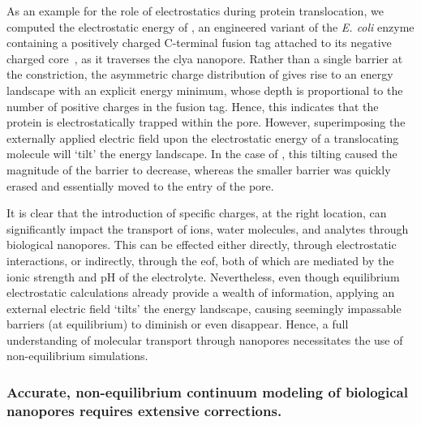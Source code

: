 As an example for the role of electrostatics during protein translocation, we computed the electrostatic
energy of \DHFRt{}, an engineered variant of the \textit{E. coli}  enzyme containing a
positively charged C-terminal fusion tag attached to its negative charged core~\cite{Soskine-Biesemans-2015},
as it traverses the \gls{clya} nanopore. Rather than a single barrier at the constriction, the asymmetric
charge distribution of \DHFRt{} gives rise to an energy landscape with an explicit energy minimum, whose depth
is proportional to the number of positive charges in the fusion tag. Hence, this indicates that the protein is
electrostatically trapped within the pore. However, superimposing the externally applied electric field upon
the electrostatic energy of a translocating molecule will `tilt' the energy landscape. In the case of
\DHFRt{}, this tilting caused the magnitude of the \transi{} barrier to decrease, whereas the smaller \cisi{}
barrier was quickly erased and essentially moved to the \cisi{} entry of the pore.

It is clear that the introduction of specific charges, at the right location, can significantly impact the
transport of ions, water molecules, and analytes through biological nanopores. This can be effected either
directly, through electrostatic interactions, or indirectly, through the \gls{eof}, both of which are mediated
by the ionic strength and pH of the electrolyte. Nevertheless, even though equilibrium electrostatic
calculations already provide a wealth of information, applying an external electric field `tilts' the energy
landscape, causing seemingly impassable barriers (at equilibrium) to diminish or even disappear. Hence, a full
understanding of molecular transport through nanopores necessitates the use of non-equilibrium simulations.


\subsubsection{Accurate, non-equilibrium continuum modeling of biological nanopores requires extensive corrections.}
%


